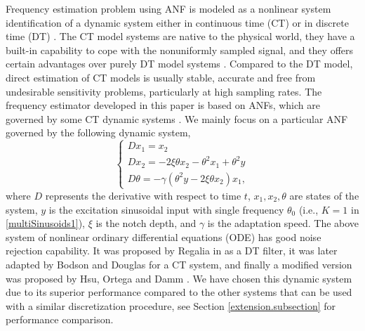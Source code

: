 \documentclass{UCF_ETD}
\begin{document}
 Frequency estimation problem using ANF is modeled as a nonlinear system identification of a dynamic system either in continuous time (CT) \cite{regalia91} or in discrete time (DT) \cite{hsuortegadamm99}. The CT model systems are native to the physical world, they have a built-in capability to cope with the nonuniformly sampled signal,
and they offers certain advantages over purely DT model systems \cite{Rao06, Garnier08}.
Compared to the DT model, %
direct estimation of CT models is usually stable, accurate and free from undesirable sensitivity problems, particularly at high
sampling rates.  The frequency estimator developed in this paper is based on ANFs, which are governed by some CT dynamic systems \cite{hsuortegadamm99, marino02, xia02, mojiri04, hou05, mojiri07, mojiri07b, bodsondouglas97, dammhsuortega98, hou13}. We mainly
 focus on a particular ANF governed by the following dynamic system,
  \begin{equation} \label{Hsu_ANF}
  \left\{
\begin{array}{l}
D{x_1} = x_2   \\
D{x_2} = -2\xi \theta x_2 - {\theta}^2x_1 + {\theta}^2y  \\
D{\theta} = -\gamma ({\theta}^2y - 2\xi \theta x_2)x_1,
\end{array}
\right.\end{equation}
where  $D$ represents the derivative with respect to time $t$, $x_1,x_2,\theta$ are  states of the system, $y$ is the excitation sinusoidal input with single frequency $\theta_0$ (i.e., $K=1$ in \eqref{multiSinusoids1}), $\xi$ is the notch depth, and $\gamma$ is the adaptation speed.    %
 The above system of nonlinear ordinary differential equations (ODE)
 has good noise rejection capability. It was proposed by Regalia in \cite{regalia91} as a DT filter, it was later adapted by Bodson and  Douglas \cite{bodsondouglas97} for a CT system, and finally a modified version was proposed by Hsu, Ortega and Damm \cite{hsuortegadamm99}.
 We have chosen this dynamic system due to its superior performance compared to the other systems that can be used with a similar discretization procedure, see Section \ref{extension.subsection} for performance comparison. %
\end{document}
